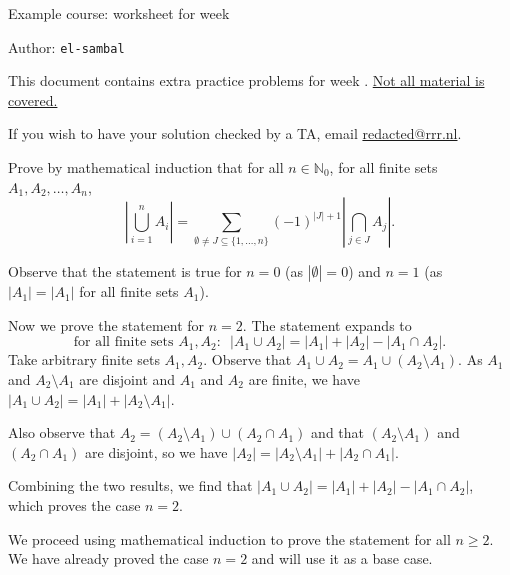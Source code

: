 \documentclass[answers]{exercises}
\newcommand{\weeknumber}{\arabic{WEEKNUMBER}}
\newcommand{\N}{\mathbb{N}}
\begin{document}
\begin{center}
	{\LARGE Example course: worksheet for week \weeknumber}

	\vspace{3mm}
	{\large Author: \texttt{el-sambal}}
\end{center}
\vspace{5mm}

\begin{instructions}
	This document contains extra practice problems for week \weeknumber. \underline{Not all material is covered.}

	\vspace{2mm}
	If you wish to have your solution checked by a TA, email \href{mailto:redacted@rrr.nl}{redacted@rrr.nl}.
\end{instructions}


\begin{questions}
	\question
	Prove by mathematical induction that for all $n\in\N_0$, for all finite sets $A_1,A_2,\dots,A_n$, \[\left|\bigcup_{i=1}^n A_i\right| = \sum_{\emptyset\neq J\subseteq\{1,\dots,n\}}(-1)^{|J|+1}\left|\bigcap_{j\in J}A_j\right|.\]

	\begin{solution}
		Observe that the statement is true for $n=0$ (as $|\emptyset|=0$) and $n=1$ (as $|A_1|=|A_1|$ for all finite sets $A_1$).

		Now we prove the statement for $n=2$. The statement expands to \[\text{for all finite sets $A_1, A_2$:}~~~|A_1\cup A_2|=|A_1|+|A_2|-|A_1\cap A_2|.\]
		Take arbitrary finite sets $A_1, A_2$. Observe that $A_1\cup A_2=A_1\cup(A_2\setminus A_1)$. As $A_1$ and $A_2\setminus A_1$ are disjoint and $A_1$ and $A_2$ are finite, we have $|A_1\cup A_2| = |A_1|+|A_2\setminus A_1|$.

		Also observe that $A_2=(A_2\setminus A_1)\cup(A_2\cap A_1)$ and that $(A_2\setminus A_1)$ and $(A_2\cap A_1)$ are disjoint, so we have $|A_2|=|A_2\setminus A_1|+|A_2\cap A_1|$.

		Combining the two results, we find that $|A_1\cup A_2|=|A_1|+|A_2|-|A_1\cap A_2|$, which proves the case $n=2$.

		We proceed using mathematical induction to prove the statement for all $n\geq2$. We have already proved the case $n=2$ and will use it as a base case.


\end{solution}
\end{questions}
\end{document}
